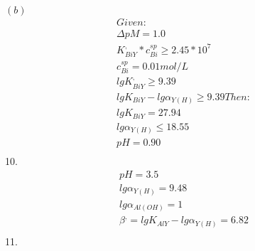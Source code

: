 \documentclass{article}
\begin{document}
$(b)$\\
\begin{equation}
    \begin{multlined}
        Given:\\
        \Delta pM = 1.0\\
        K^{,}_{BiY}*c^{sp}_{Bi} \geq 2.45*10^7\\
        c^{sp}_{Bi} = 0.01 mol/L\\
        lg K^{,}_{BiY} \geq 9.39\\
        lg K_{BiY} - lg\alpha_{Y(H)} \geq 9.39
        Then:\\
        lg K_{BiY} = 27.94\\
        lg\alpha_{Y(H)} \leq 18.55\\
        pH = 0.90\\
    \end{multlined}
\end{equation}
10.\begin{equation}
    \begin{multlined}
        pH = 3.5\\
        lg \alpha_{Y(H)} = 9.48\\
        lg \alpha_{Al(OH)} = 1\\
        \beta^{,} = lg K_{AlY} - lg \alpha_{Y(H)} = 6.82\\
    \end{multlined}
\end{equation}
11. 
\end{document}
